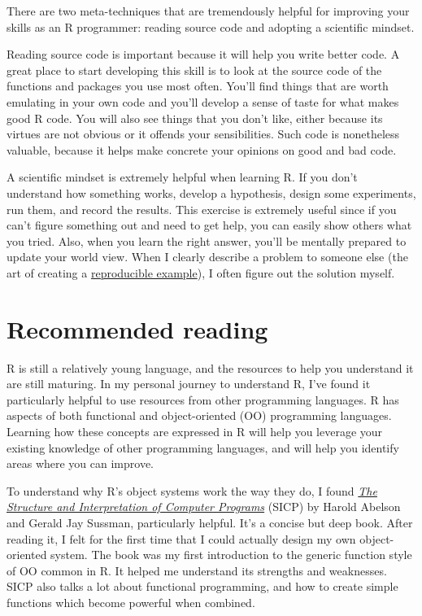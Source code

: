 There are two meta-techniques that are tremendously helpful for
improving your skills as an R programmer: reading source code and
adopting a scientific mindset.

Reading source code is important because it will help you write better
code. A great place to start developing this skill is to look at the
source code of the functions and packages you use most often. You'll
find things that are worth emulating in your own code and you'll develop
a sense of taste for what makes good R code. You will also see things
that you don't like, either because its virtues are not obvious or it
offends your sensibilities. Such code is nonetheless valuable, because
it helps make concrete your opinions on good and bad code.

A scientific mindset is extremely helpful when learning R. If you don't
understand how something works, develop a hypothesis, design some
experiments, run them, and record the results. This exercise is
extremely useful since if you can't figure something out and need to get
help, you can easily show others what you tried. Also, when you learn
the right answer, you'll be mentally prepared to update your world view.
When I clearly describe a problem to someone else (the art of creating a
\href{http://stackoverflow.com/questions/5963269}{reproducible
example}), I often figure out the solution myself.

\section{Recommended reading}

R is still a relatively young language, and the resources to help you
understand it are still maturing. In my personal journey to understand
R, I've found it particularly helpful to use resources from other
programming languages. R has aspects of both functional and
object-oriented (OO) programming languages. Learning how these concepts
are expressed in R will help you leverage your existing knowledge of
other programming languages, and will help you identify areas where you
can improve.

To understand why R's object systems work the way they do, I found
\href{http://mitpress.mit.edu/sicp/full-text/book/book.html}{\emph{The
Structure and Interpretation of Computer Programs}} (SICP) by Harold
Abelson and Gerald Jay Sussman, particularly helpful. It's a concise but
deep book. After reading it, I felt for the first time that I could
actually design my own object-oriented system. The book was my first
introduction to the generic function style of OO common in R. It helped
me understand its strengths and weaknesses. SICP also talks a lot about
functional programming, and how to create simple functions which become
powerful when combined.

